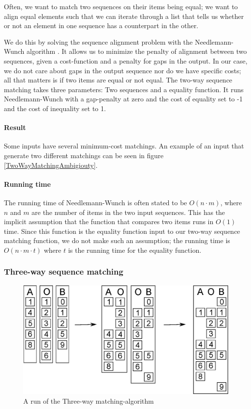\documentclass[11pt]{article}
\begin{document}
Often, we want to match two sequences on their items being equal; we want to align equal elements such that we can iterate through a list that tells us whether or not an element in one sequence has a counterpart in the other.

We do this by solving the sequence alignment problem with the Needlemann-Wunch algorithm . It allows us to minimize the penalty of alignment between two sequences, given a cost-function and a penalty for gaps in the output. In our case, we do not care about gaps in the output sequence nor do we have specific costs; all that matters is if two items are equal or not equal. The two-way sequence matching takes three parameters: Two sequences and a equality function. It runs Needlemann-Wunch with a gap-penalty at zero and the cost of equality set to -1 and the cost of inequality set to 1.

\paragraph{Result} Some inputs have several minimum-cost matchings. An example of an input that generate two different matchings can be seen in figure \ref{TwoWayMatchingAmbigiouty}.

\paragraph{Running time} The running time of Needlemann-Wunch is often stated to be $O(n \cdot m)$, where $n$ and $m$ are the number of items in the two input sequences. This has the implicit assumption that the function that compares two items runs in $O(1)$ time. Since this function is the equality function input to our two-way sequence matching function, we do not make such an assumption; the running time is $O(n \cdot m \cdot t)$ where $t$ is the running time for the equality function.

\subsubsection{Three-way sequence matching}
\begin{figure}
   \centerline{\includegraphics[scale=0.6]{drawings/eps/threewaymatching.eps}}
   \caption{A run of the Three-way matching-algorithm}
   \label{ThreewayMatching}
\end{figure}
\end{document}
